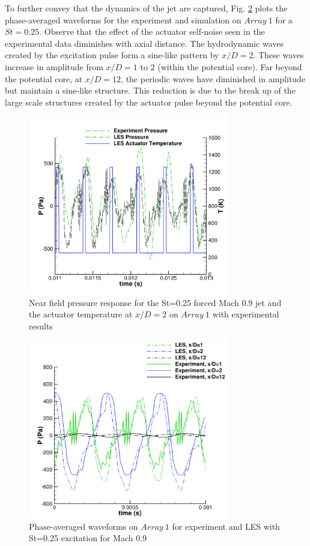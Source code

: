\documentclass[english]{aiaa-tc}
\begin{document}
To further convey that the dynamics of the jet are captured, Fig. \ref{fig:phasex2all} plots the phase-averaged waveforms for the experiment and simulation on $Array~1$ for a $St=0.25$. Observe that the effect of the actuator self-noise seen in the experimental data diminishes with axial distance. The hydrodynamic waves created by the excitation pulse form a sine-like pattern by $x/D=2$. These waves increase in amplitude from $x/D=1$ to $2$ (within the potential core). Far beyond the potential core, at $x/D=12$, the periodic waves have diminished in amplitude but maintain a sine-like structure. This reduction is due to the break up of the large scale structures created by the actuator pulse beyond the potential core. 
\begin{figure}
\begin{center}
	\includegraphics[width=3.5in]{M09pointwithactuatorx2array1ST025}%
	\caption{Near field pressure response for the St=0.25 forced Mach $0.9$ jet and the actuator temperature at $x/D=2$ on $Array~1$ with experimental results \cite{Crawley2014}}
	\label{fig:pointprobeM09}
\end{center}
\end{figure}
\begin{figure}
\begin{center}
	\includegraphics[width=3.5in]{M09LESandExpaxialphase}%
\caption{Phase-averaged waveforms on $Array~1$ for experiment \cite{Crawley2014} and LES with St=0.25 excitation for Mach 0.9}
\label{fig:phasex2all}
\end{center}
 \end{figure}
\end{document}
